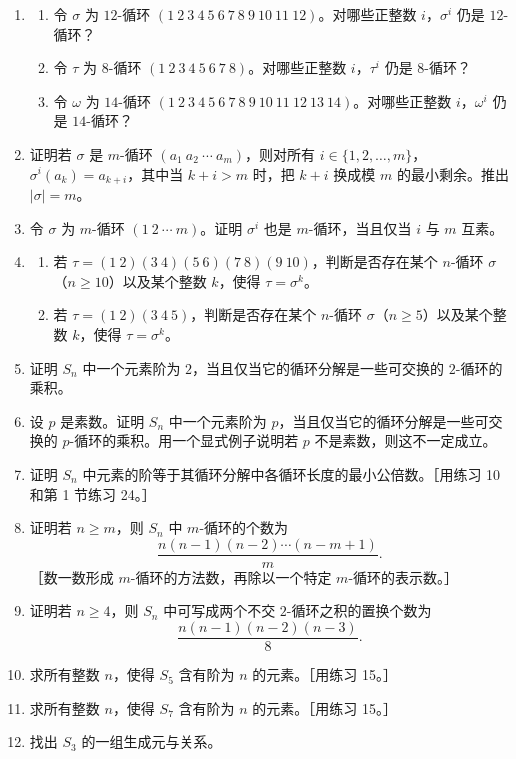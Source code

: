 \begin{enumerate}[label=\arabic*.]
  \item
  \begin{enumerate}[label=(\alph*)]
    \item 令 $\sigma$ 为 $12$-循环 $(1\ 2\ 3\ 4\ 5\ 6\ 7\ 8\ 9\ 10\ 11\ 12)$。对哪些正整数 $i$，$\sigma^i$ 仍是 $12$-循环？
    \item 令 $\tau$ 为 $8$-循环 $(1\ 2\ 3\ 4\ 5\ 6\ 7\ 8)$。对哪些正整数 $i$，$\tau^i$ 仍是 $8$-循环？
    \item 令 $\omega$ 为 $14$-循环 $(1\ 2\ 3\ 4\ 5\ 6\ 7\ 8\ 9\ 10\ 11\ 12\ 13\ 14)$。对哪些正整数 $i$，$\omega^i$ 仍是 $14$-循环？
  \end{enumerate}
  \item 证明若 $\sigma$ 是 $m$-循环 $(a_1\ a_2\ \cdots\ a_m)$，则对所有 $i\in\{1,2,\ldots,m\}$，$\sigma^i(a_k)=a_{k+i}$，其中当 $k+i>m$ 时，把 $k+i$ 换成模 $m$ 的最小剩余。推出 $|\sigma|=m$。
  \item 令 $\sigma$ 为 $m$-循环 $(1\ 2\ \cdots\ m)$。证明 $\sigma^i$ 也是 $m$-循环，当且仅当 $i$ 与 $m$ 互素。
  \item
  \begin{enumerate}[label=(\alph*)]
    \item 若 $\tau=(1\ 2)(3\ 4)(5\ 6)(7\ 8)(9\ 10)$，判断是否存在某个 $n$-循环 $\sigma$（$n\geq10$）以及某个整数 $k$，使得 $\tau=\sigma^k$。
    \item 若 $\tau=(1\ 2)(3\ 4\ 5)$，判断是否存在某个 $n$-循环 $\sigma$（$n\geq5$）以及某个整数 $k$，使得 $\tau=\sigma^k$。
  \end{enumerate}
  \item 证明 $S_n$ 中一个元素阶为 $2$，当且仅当它的循环分解是一些可交换的 $2$-循环的乘积。
  \item 设 $p$ 是素数。证明 $S_n$ 中一个元素阶为 $p$，当且仅当它的循环分解是一些可交换的 $p$-循环的乘积。用一个显式例子说明若 $p$ 不是素数，则这不一定成立。
  \item 证明 $S_n$ 中元素的阶等于其循环分解中各循环长度的最小公倍数。［用练习 10 和第 1 节练习 24。］
  \item 证明若 $n\geq m$，则 $S_n$ 中 $m$-循环的个数为
  \[
    \frac{n(n-1)(n-2)\cdots(n-m+1)}{m}.
  \]
  ［数一数形成 $m$-循环的方法数，再除以一个特定 $m$-循环的表示数。］
  \item 证明若 $n\geq4$，则 $S_n$ 中可写成两个不交 $2$-循环之积的置换个数为
  \[
    \frac{n(n-1)(n-2)(n-3)}{8}.
  \]
  \item 求所有整数 $n$，使得 $S_5$ 含有阶为 $n$ 的元素。［用练习 15。］
  \item 求所有整数 $n$，使得 $S_7$ 含有阶为 $n$ 的元素。［用练习 15。］
  \item 找出 $S_3$ 的一组生成元与关系。
\end{enumerate}

